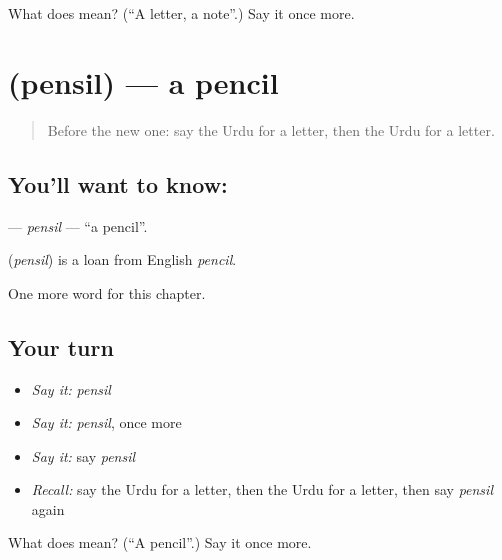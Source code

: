 \begin{tcolorbox}[breakable,colback=teal!4,colframe=teal!35!black,title={Before you move on}]
What does  mean? (\textquotedblleft{}A letter, a note\textquotedblright{}.) Say it once more.
\end{tcolorbox}
\section[\texorpdfstring{\ur{پنسل} (pensil)}{پنسل (pensil)}]{ (pensil) — a pencil}

\label{lesson:UR-C113-pensil}



\begin{quote}
Before the new one: say the Urdu for a letter, then the Urdu for a letter.
\end{quote}

\subsection*{You'll want to know: }
\textbf{} — \emph{pensil} — \textquotedblleft{}a pencil\textquotedblright{}.

\begin{cousinweb}
\textbf{} (\emph{pensil}) is a loan from English \emph{pencil}.
\end{cousinweb}

\begin{grammarlens}[title={What you've built}]
One more word for this chapter.
\end{grammarlens}

\subsection*{Your turn}
\begin{itemize}
\raggedright
  \item \emph{Say it:} \emph{pensil}
  \item \emph{Say it:} \emph{pensil}, once more
  \item \emph{Say it:} say \emph{pensil}
  \item \emph{Recall:} say the Urdu for a letter, then the Urdu for a letter, then say \emph{pensil} again
\end{itemize}

\begin{tcolorbox}[breakable,colback=teal!4,colframe=teal!35!black,title={Before you move on}]
What does  mean? (\textquotedblleft{}A pencil\textquotedblright{}.) Say it once more.
\end{tcolorbox}
